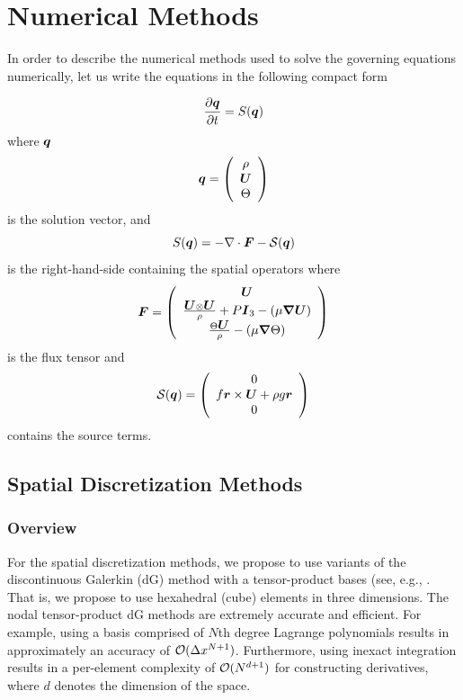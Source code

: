 \documentclass[12pt]{article}
\begin{document}

\section{Numerical Methods}
\label{sec:numerical_methods}

In order to describe the numerical methods used to solve the governing equations numerically, let us write the equations in the following compact form

\[
\frac{\partial \mbox{\boldmath$q$\unboldmath}}{\partial t} = S(\mbox{\boldmath$q$\unboldmath})
\]
where $\mbox{\boldmath$q$\unboldmath}$
\[
\mbox{\boldmath$q$\unboldmath}=\left( \begin{array}{c}
\rho \\
\mbox{\boldmath$U$\unboldmath} \\
\Theta
\end{array}
\right)
\]
 is the solution vector, 
 and 
 \[
 S(\mbox{\boldmath$q$\unboldmath}) = - \nabla \cdot \mbox{\boldmath$F$\unboldmath} - \mathcal{S}(\mbox{\boldmath$q$\unboldmath})
 \]
 is the right-hand-side containing the spatial operators where 
 \[
 \mbox{\boldmath$F$\unboldmath}=\left( \begin{array}{c}
 \mbox{\boldmath$U$\unboldmath} \\
 \frac{\mbox{\boldmath$U$\unboldmath} \otimes \mbox{\boldmath$U$\unboldmath}}{\rho} + P \mbox{\boldmath$I$\unboldmath}_3 - \left( \mu \mbox{\boldmath$\nabla$\unboldmath} \mbox{\boldmath$U$\unboldmath} \right) \\
\frac{\Theta \mbox{\boldmath$U$\unboldmath}}{\rho} - \left( \mu \mbox{\boldmath$\nabla$\unboldmath} \Theta \right)
\end{array}
\right)
 \]
 is the flux tensor and
 \[
 \mathcal{S}(\mbox{\boldmath$q$\unboldmath})=\left( \begin{array}{c}
 0 \\
 f \mbox{\boldmath$r$\unboldmath} \times \mbox{\boldmath$U$\unboldmath} + \rho g \mbox{\boldmath$r$\unboldmath} \\
0 
\end{array}
\right)
 \]
contains the source terms. 

\subsection{Spatial Discretization Methods}

\subsubsection{Overview}
For the spatial discretization methods, we propose to use variants of the discontinuous Galerkin (dG) method with a tensor-product bases (see, e.g., \cite{giraldo:2008a, abdi:2016}. That is, we propose to use hexahedral (cube) elements in three dimensions.  The nodal tensor-product dG methods are extremely accurate and efficient.  For example, using a basis comprised of $N$th degree Lagrange polynomials results in approximately an accuracy of $\mathcal{O}(\Delta x^{N+1})$. Furthermore, using inexact integration results in a per-element complexity of $\mathcal{O}(N^{d+1})$ for constructing derivatives, where $d$ denotes the dimension of the space. 
\end{document}
